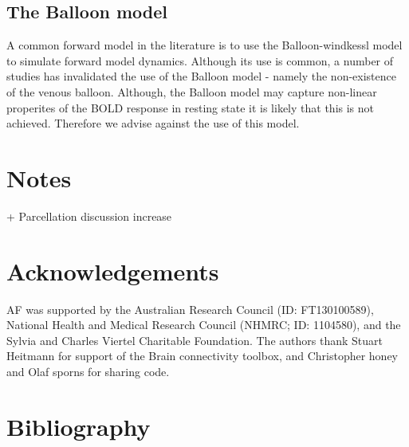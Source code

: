 \documentclass[oneside]{zHenriquesLab-StyleBioRxiv}
\begin{document}
\subsection*{The Balloon model} 

A common forward model in the literature is to use the Balloon-windkessl model to simulate forward model dynamics. Although its use is common, a number of studies has invalidated the use of the Balloon model - namely the non-existence of the venous balloon. Although, the Balloon model may capture non-linear properites of the BOLD response in resting state it is likely that this is not achieved. Therefore we advise against the use of this model. 

\section*{Notes}
+ Parcellation discussion increase

\section*{Acknowledgements}


\begin{acknowledgements}
AF was supported by the Australian Research Council (ID: FT130100589), National Health and Medical Research Council (NHMRC; ID: 1104580), and the Sylvia and Charles Viertel Charitable Foundation. The authors thank Stuart Heitmann for support of the Brain connectivity toolbox, and Christopher honey and Olaf sporns for sharing code. 
\end{acknowledgements}

\section*{Bibliography}



\onecolumn
\newpage


\end{document}
